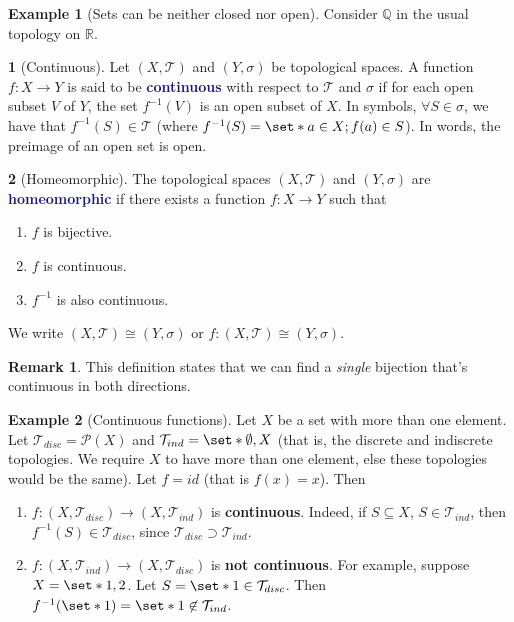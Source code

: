 \documentclass[11pt]{article}
\numberwithin{equation}{section}
\newcommand{\navy}[1]{\textcolor{MidnightBlue}{\bf #1}}
\theoremstyle{plain}
\theoremstyle{definition}
\newtheorem{definition}{\color{MidnightBlue}{\textbf{Definition}}}[section]
\newtheorem{example}{\color{WildStrawberry}Example}[section]
\newtheorem*{remark}{Remark}
\newcommand\inv[1]{#1^{-1}}
\def\Set{\set*}%
\def\sse{\subseteq}
\newcommand{\1}{\mathbbm 1}
\newcommand{\RR}{\mathbb R}
\newcommand{\QQ}{\mathbb Q}
\newcommand{\pP}{\mathcal P}
\newcommand{\tT}{\mathcal T}
\begin{document}
\begin{example}[Sets can be neither closed nor open]
	Consider $\QQ$ in the usual topology on $\RR$. 
\end{example}


\begin{definition}[Continuous]
	Let $(X,\tT)$ and $(Y,\sigma)$ be topological spaces. A function $f : X \to Y$ is said to be \navy{continuous} with respect to $\tT$ and $\sigma$ if for each open subset $V$ of $Y$, the set $f^{-1}(V)$ is an open subset of $X$. In symbols, $\forall S \in \sigma$, we have that $\inv{f}(S) \in \tT$ (where $\inv{f}(S) = \Set{a \in X; f(a) \in S}$). In words, the preimage of an open set is open. 
\end{definition}

\begin{definition}[Homeomorphic]
	The topological spaces $(X,\tT)$ and $(Y,\sigma)$ are \navy{homeomorphic} if there exists a function $f: X \to Y$ such that 
	\begin{enumerate}
		\item $f$ is bijective.
		\item $f$ is continuous.
		\item $\inv{f}$ is also continuous. 
	\end{enumerate}
	We write $(X,\tT) \cong (Y,\sigma)$ or $f: (X,\tT) \cong (Y,\sigma)$. 
\end{definition}
\begin{remark}
	This definition states that we can find a \emph{single} bijection that's continuous in both directions. 
\end{remark}

\begin{example}[Continuous functions]
	Let $X$ be a set with more than one element. Let $\tT_{disc} = \pP(X)$ and $\tT_{ind} = \Set{\emptyset, X}$ (that is, the discrete and indiscrete topologies. We require $X$ to have more than one element, else these topologies would be the same). Let $f = id$ (that is $f(x) = x$). Then
	\begin{enumerate}
		\item $f: (X,\tT_{disc}) \to (X,\tT_{ind})$ is \textbf{continuous}. Indeed, if $S \sse X$, $S\in \tT_{ind}$, then $f^{-1}(S) \in \tT_{disc}$, since $\tT_{disc} \supset \tT_{ind}$. 

		\item $f: (X,\tT_{ind}) \to (X,\tT_{disc})$ is \textbf{not continuous}. For example, suppose $X = \Set{1,2}$. Let $S = \Set{1} \in \tT_{disc}$. Then $\inv{f}(\Set{1}) = \Set{1} \not \in \tT_{ind}$. 
	\end{enumerate}
\end{example}
\end{document}
